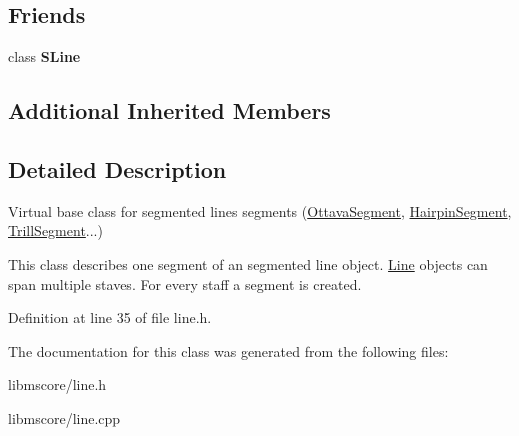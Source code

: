 \subsection*{Friends}
\begin{DoxyCompactItemize}
\item 
\mbox{\label{class_ms_1_1_line_segment_a69b89916c4577a4a9afa37bdec81bfee}} 
class {\bfseries S\+Line}
\end{DoxyCompactItemize}
\subsection*{Additional Inherited Members}


\subsection{Detailed Description}
Virtual base class for segmented lines segments (\hyperlink{class_ms_1_1_ottava_segment}{Ottava\+Segment}, \hyperlink{class_ms_1_1_hairpin_segment}{Hairpin\+Segment}, \hyperlink{class_ms_1_1_trill_segment}{Trill\+Segment}...)

This class describes one segment of an segmented line object. \hyperlink{class_ms_1_1_line}{Line} objects can span multiple staves. For every staff a segment is created. 

Definition at line 35 of file line.\+h.



The documentation for this class was generated from the following files\+:\begin{DoxyCompactItemize}
\item 
libmscore/line.\+h\item 
libmscore/line.\+cpp\end{DoxyCompactItemize}
